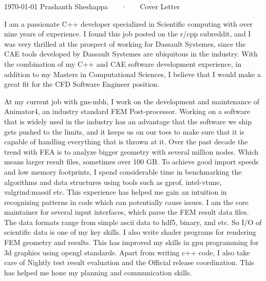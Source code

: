 \documentclass[11pt, a4paper]{awesome-cv}
\newcommand{\company}{Dassault Systemes}
\begin{document}
\makecvheader[R]

\makecvfooter
  {\today}
  {Prashanth Sheshappa ~~~·~~~ Cover Letter}
  {}

\makelettertitle

\begin{cvletter}


I am a passionate C++ developer specialized in Scientific computing with over 
nine years of experience. I found this job posted on the r/cpp subreddit, and I 
was very thrilled at the prospect of working for \company{}, since the 
CAE tools developed by \company{} are ubiquitous in the industry. \newline{}
With the combination of my C++ and CAE software development experience, in 
addition to my Masters in Computational Sciences, I believe that I would make 
a great fit for the CFD Software Engineer position.

At my current job with gns-mbh, I work on the development and maintenance of 
Animator4, an industry standard FEM Post-processor. 
Working on a software that is widely used in the industry has an advantage that 
the software we ship gets pushed to the limits, and it keeps us on our toes to 
make sure that it is capable of handling everything that is thrown at it. 
Over the past decade the trend with FEA is to analyze bigger geometry 
with several million nodes. Which means larger result files, sometimes over 100 
GB. To achieve good import speeds and low memory footprints, I spend 
considerable time in benchmarking the algorithms and data structures using tools
 such as gprof, intel-vtune, valgrind:massif etc.
This experience has helped me gain an intuition in recognizing patterns in code
which can potentially cause issues.   
I am the core maintainer for several input interfaces, which parse the FEM 
result data files. The data formats range from simple ascii data to hdf5, binary, 
xml etc. So I/O of scientific data is one of my key skills. 
I also write shader programs for rendering FEM geometry and results. This has 
improved my skills in gpu programming for 3d graphics using opengl standards.
Apart from writing c++ code, I also take care of Nightly test result evaluation
and the Official release coordination. This has helped me hone my planning and 
communication skills.


\end{cvletter}
\end{document}
